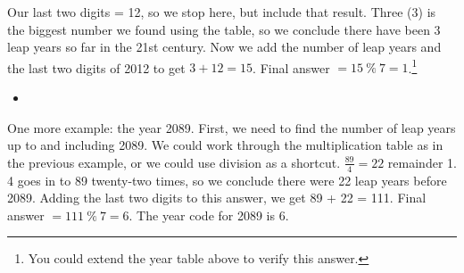 \documentclass{article}
\begin{document}
  Our last two digits = 12, so we stop here, but include that result. 
  Three (3) is the biggest number we found using the table, 
  so we conclude there have been 3 leap years so far in the 21st century. 
  Now we add the number of leap years and the last two digits of 2012 to get $3 + 12 = 15$.
  Final answer $= 15 \ \% \ 7 = 1$.\footnote{You could extend 
  the year table above to verify this answer.}

  \begin{itemize} \item[] \end{itemize}

  One more example: the year 2089. 
  First, we need to find the number of leap years up to and including 2089.
  We could work through the multiplication table as in the previous example, 
  or we could use division as a shortcut.
  $\frac{89}{4} = 22$ remainder 1. 
  4 goes in to 89 twenty-two times, so we conclude there were 22 leap years before 2089.
  Adding the last two digits to this answer, we get 89 + 22 = 111. 
  Final answer $= 111 \ \% \ 7 = 6$. The year code for 2089 is 6.

\newpage
\end{document}
